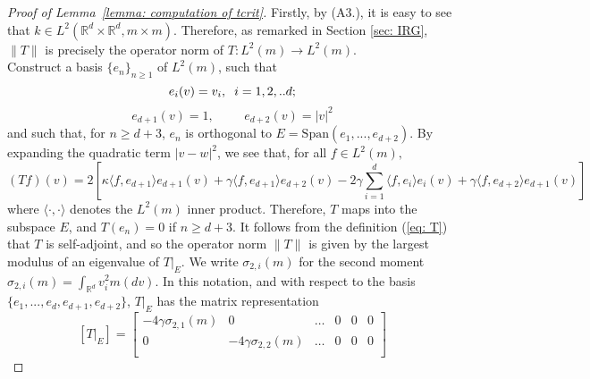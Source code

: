 \documentclass[11pt, notitlepage]{article}
\begin{document}
\begin{proof}[Proof of Lemma~\ref{lemma: computation of tcrit}]
Firstly, by (A3.), it is easy to see that $k\in L^2(\mathbb{R}^d\times \mathbb{R}^d,m\times m)$. Therefore, as remarked in Section \ref{sec: IRG}, $\|T\|$ is precisely the operator norm of $T: L^2(m)\rightarrow L^2(m)$. \medskip \\ Construct a basis $\{e_n\}_{n\geq 1}$ of $L^2(m)$, such that \begin{equation}
       e_i(v)=v_i, \hspace{0.2cm}i=1,2,..d;
   \end{equation}
   \begin{equation}
       e_{d+1}(v)=1, \hspace{1cm}e_{d+2}(v)=|v|^2
   \end{equation} and such that, for $n\geq d+3$, $e_n$ is orthogonal to $E=\text{Span}(e_1,...,e_{d+2})$.
   By expanding the quadratic term $|v-w|^2$, we see that, for all $f\in L^2(m),$ \begin{equation} 
       (Tf)(v)  =2\left[\kappa\langle f, e_{d+1}\rangle e_{d+1}(v)
       +\gamma \langle f, e_{d+1}\rangle e_{d+2}(v)
       -2\gamma \sum_{i=1}^d \langle f, e_i\rangle e_i(v)
       +\gamma \langle f, e_{d+2}\rangle e_{d+1}(v)\right]
   \end{equation} 
 where $\langle\cdot,\cdot\rangle$ denotes the $L^2(m)$ inner product. Therefore, $T$ maps into the subspace $E$, and $T(e_n)=0$ if $n\geq d+3.$ It follows from the definition (\ref{eq: T}) that $T$ is self-adjoint, and so the operator norm $\|T\|$ is given by the largest modulus of an eigenvalue of $T|_E.$ We write $\sigma_{2,i}(m)$ for the second moment $\sigma_{2,i}(m)=\int_{\mathbb{R}^d} v_i^2 m(dv)$. In this notation, and with respect to the basis $\{e_1,...,e_d, e_{d+1}, e_{d+2}\}$,  $T|_E$ has the matrix representation  \begin{equation}
       \left[T|_E\right]=\begin{bmatrix}
    -4\gamma\sigma_{2,1}(m) & 0  & \dots  &0 & 0 &0 \\
    0&-4\gamma\sigma_{2,2}(m)   & \dots  &0 & 0 &0 \\
    

\end{bmatrix}
\end{equation}
\end{proof}
\end{document}
